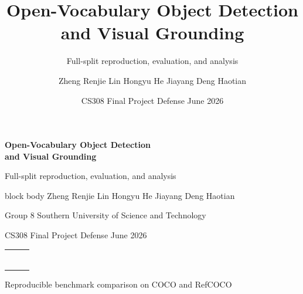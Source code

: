 \documentclass[aspectratio=169,professionalfonts]{beamer}
\title[OVD and Visual Grounding]{Open-Vocabulary Object Detection and Visual Grounding}
\subtitle{Full-split reproduction, evaluation, and analysis}
\author{Zheng Renjie \quad Lin Hongyu \quad He Jiayang \quad Deng Haotian}
\institute{Group 8 \quad Southern University of Science and Technology}
\date{CS308 Final Project Defense \quad June 2026}
\begin{document}
\begin{frame}[plain]
  \vspace*{0.8cm}
  \begin{center}
    {\color{ProjBlue}\bfseries\fontsize{26}{30}\selectfont
    Open-Vocabulary Object Detection\\[0.15em]
    and Visual Grounding}

    \vspace{0.55cm}
    {\large Full-split reproduction, evaluation, and analysis}

    \vspace{0.8cm}
    \begin{beamercolorbox}[wd=0.82\textwidth,sep=0.8em,rounded=true,center]{block body}
      \normalsize
      Zheng Renjie \quad Lin Hongyu \quad He Jiayang \quad Deng Haotian

      \vspace{0.25em}
      \footnotesize
      Group 8 \quad Southern University of Science and Technology

      \vspace{0.25em}
      \small
      CS308 Final Project Defense \quad June 2026
    \end{beamercolorbox}

    \vspace{0.55cm}
    \begin{tabular}{@{}ccc@{}}
      \textcolor{ProjBlue}{\rule{1.8cm}{0.16cm}} &
      \textcolor{ProjOrange}{\rule{1.8cm}{0.16cm}} &
      \textcolor{ProjGreen}{\rule{1.8cm}{0.16cm}} \\
    \end{tabular}

    \vfill
    \footnotesize
    Reproducible benchmark comparison on COCO and RefCOCO
  \end{center}
\end{frame}
\end{document}
